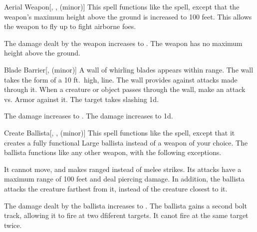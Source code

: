 \lowercase{\hypertarget{spell:Aerial Weapon}{}}\label{spell:Aerial Weapon}
\begin{freeability}[Rank 3]{\hypertarget{spell:Aerial Weapon}{Aerial Weapon}}[, ,  (minor)]
This spell functions like the  spell, except that the weapon's maximum height above the ground is increased to 100 feet.
This allows the weapon to fly up to fight airborne foes.

\rankline
{} The damage dealt by the weapon increases to .
 The weapon has no maximum height above the ground.
\end{freeability}
\vspace{0.25em}



\lowercase{\hypertarget{spell:Blade Barrier}{}}\label{spell:Blade Barrier}
\begin{freeability}[Rank 3]{\hypertarget{spell:Blade Barrier}{Blade Barrier}}[,  (minor)]
A wall of whirling blades appears within \rngmed range.
The wall takes the form of a 10 ft.\ high, \arealarge line.
The wall provides  against attacks made through it.
When a creature or object passes through the wall, make an attack vs. Armor against it.
\hit The target takes slashing  \minus1d.

\rankline
{} The damage increases to .
 The damage increases to  \plus1d.
\end{freeability}
\vspace{0.25em}



\lowercase{\hypertarget{spell:Create Ballista}{}}\label{spell:Create Ballista}
\begin{freeability}[Rank 3]{\hypertarget{spell:Create Ballista}{Create Ballista}}[, ,  (minor)]
This spell functions like the  spell, except that it creates a fully functional Large ballista instead of a weapon of your choice.
The ballista functions like any other weapon, with the following exceptions.

It cannot move, and makes ranged  instead of melee strikes.
Its attacks have a maximum range of 100 feet and deal piercing damage.
In addition, the ballista attacks the creature farthest from it, instead of the creature closest to it.

\rankline
{} The damage dealt by the ballista increases to .
 The ballista gains a second bolt track, allowing it to fire at two dfiferent targets.
It canot fire at the same target twice.
\end{freeability}
\vspace{0.25em}



